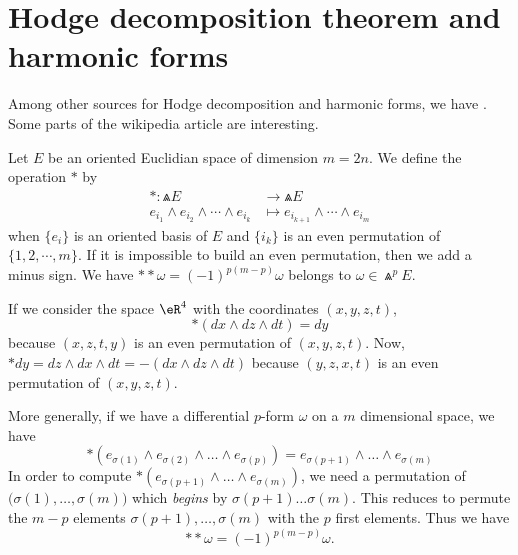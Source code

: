 \section{Hodge decomposition theorem and harmonic forms}

Among other sources for Hodge decomposition and harmonic forms, we have \cite{JohnsonHodge,CohoHarBound,UndergradDeRham}. Some parts of the wikipedia article  are interesting.

Let $E$ be an oriented Euclidian space of dimension $m=2n$. We define the operation $*$ by
\begin{equation}		\label{EqGradWedge}
	\begin{aligned}
		*\colon \Wedge E&\to \Wedge E \\
		e_{i_1}\wedge e_{i_2}\wedge\cdots\wedge e_{i_k}&\mapsto e_{i_{k+1}}\wedge\cdots\wedge e_{i_m} 
	\end{aligned}
\end{equation}
when $\{ e_i \}$ is an oriented basis of $E$ and $\{ i_k \}$ is an even permutation of $\{ 1,2,\cdots,m \}$. If it is impossible to build an even permutation, then we add a minus sign. We have $**\omega=(-1)^{p(m-p)}\omega$ belongs to $\omega\in\Wedge^pE$.
\begin{example}
	If we consider the space $\eR^4$ with the coordinates $(x,y,z,t)$,
	\begin{equation}
		*(dx\wedge dz\wedge dt)=dy
	\end{equation}
	because $(x,z,t,y)$ is an even permutation of $(x,y,z,t)$. Now, $*dy=dz\wedge dx\wedge dt=-(dx\wedge dz\wedge dt)$ because $(y,z,x,t)$ is an even permutation of $(x,y,z,t)$.

	More generally, if we have a differential $p$-form $\omega$ on a $m$ dimensional space, we have
	\begin{equation}
		*(e_{\sigma(1)}\wedge e_{\sigma(2)}\wedge\ldots\wedge e_{\sigma(p)})=e_{\sigma(p+1)}\wedge \ldots\wedge e_{\sigma(m)}
	\end{equation}
	In order to compute $*(e_{\sigma(p+1)}\wedge \ldots\wedge e_{\sigma(m)})$, we need a permutation of $\big( \sigma(1),\ldots, \sigma(m)\big)$ which \emph{begins} by $\sigma(p+1)\ldots\sigma(m)$. This reduces to permute the $m-p$ elements $\sigma(p+1),\ldots,\sigma(m)$ with the $p$ first elements. Thus we have
	\begin{equation}
		**\omega=(-1)^{p(m-p)}\omega.
	\end{equation}
\end{example}


